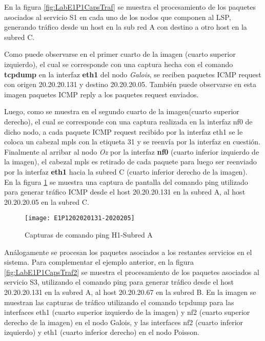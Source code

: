 En la figura \ref{fig:LabE1P1CapsTraf} se muestra el procesamiento de los paquetes asociados al servicio S1 en cada uno de los nodos que componen al LSP, generando tr\'afico desde un host en la sub red A con destino a otro host en la subred C.

Como puede observarse en el primer cuarto de la imagen (cuarto superior izquierdo), el cual se corresponde con una captura hecha con el comando \textbf{tcpdump} en la interfaz \textbf{eth1} del nodo \textit{Galois}, se reciben paquetes ICMP request con origen 20.20.20.131 y destino 20.20.20.05. Tambi\'en puede observarse en esta imagen paquetes ICMP reply a los paquetes request enviados.

Luego, como se muestra en el segundo cuarto de la imagen(cuarto superior derecho), el cual se corresponde con una captura realizada en la interfaz nf0 de dicho nodo, a cada paquete ICMP request recibido por la interfaz eth1 se le coloca un cabezal mpls con la etiqueta 31 y se reenvía por la interfaz en cuestión. Finalmente al arribar al nodo \textit{Oz} por la interfaz \textbf{nf0} (cuarto inferior izquierdo de la imagen), el cabezal mpls es retirado de cada paquete para luego ser reenviado por la interfaz \textbf{eth1} hacia la subred C (cuarto inferior derecho de la imagen).\\

En la figura \ref{fig:LabE1P1CapHost} se muestra una captura de pantalla del comando ping utilizado para generar tr\'afico ICMP desde el host 20.20.20.131 en la subred A, al host 20.20.20.05 en la subred C.

\begin{figure}[h!] 
\centering    
\texttt{[image: E1P1202020131-2020205]}
\caption[Capturas de comando ping H1-Subred A]{Capturas de comando ping H1-Subred A}
\label{fig:LabE1P1CapHost}
\end{figure}

Análogamente se procesan los paquetes asociados a los restantes servicios en el sistema. Para complementar el ejemplo anterior, en la figura \ref{fig:LabE1P1CapsTraf2} se muestra el procesamiento de los paquetes asociados al servicio S3, utilizando el comando ping para generar tr\'afico desde el host 20.20.20.131 en la subred A, al host 20.20.20.67 en la subred B. En la imagen se muestran las capturas de tr\'afico utilizando el comando tcpdump para las interfaces eth1 (cuarto superior izquierdo de la imagen) y nf2 (cuarto superior derecho de la imagen) en el nodo Galois, y las interfaces nf2 (cuarto inferior izquierdo) y eth1 (cuarto inferior derecho) en el nodo Poisson.\\

